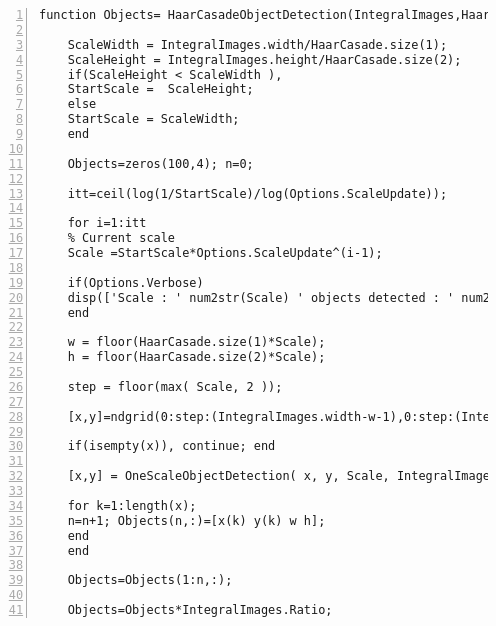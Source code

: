 \begin{lstlisting}[style=Matlab-editor, numbers=left,label={lst:HaarCasadeObjectDetection},captionpos=b, caption={Code \textbf{HaarCasadeObjectDetection.m} }]
	function Objects= HaarCasadeObjectDetection(IntegralImages,HaarCasade,Options)
	
	ScaleWidth = IntegralImages.width/HaarCasade.size(1);
	ScaleHeight = IntegralImages.height/HaarCasade.size(2);
	if(ScaleHeight < ScaleWidth ), 
	StartScale =  ScaleHeight; 
	else
	StartScale = ScaleWidth;
	end
	
	Objects=zeros(100,4); n=0; 
	
	itt=ceil(log(1/StartScale)/log(Options.ScaleUpdate));
	
	for i=1:itt
	% Current scale
	Scale =StartScale*Options.ScaleUpdate^(i-1);    
	
	if(Options.Verbose)
	disp(['Scale : ' num2str(Scale) ' objects detected : ' num2str(n) ])
	end
	
	w = floor(HaarCasade.size(1)*Scale);
	h = floor(HaarCasade.size(2)*Scale);
	
	step = floor(max( Scale, 2 ));
	
	[x,y]=ndgrid(0:step:(IntegralImages.width-w-1),0:step:(IntegralImages.height-h-1)); x=x(:); y=y(:);
	
	if(isempty(x)), continue; end
	
	[x,y] = OneScaleObjectDetection( x, y, Scale, IntegralImages, w, h, HaarCasade);
	
	for k=1:length(x);
	n=n+1; Objects(n,:)=[x(k) y(k) w h];
	end
	end
	
	Objects=Objects(1:n,:);
	
	Objects=Objects*IntegralImages.Ratio;
\end{lstlisting}

